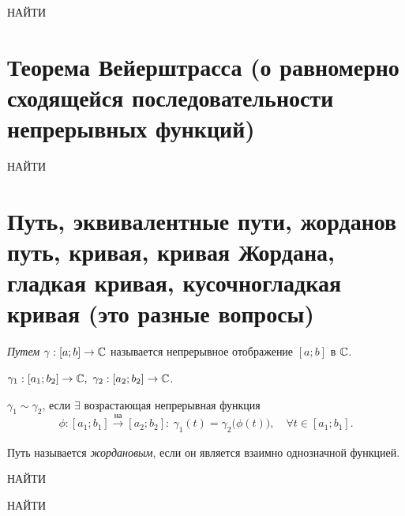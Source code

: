  {\huge НАЙТИ}

\section{Теорема Вейерштрасса (о равномерно сходящейся последовательности непрерывных функций)}

 {\huge НАЙТИ}

\section{Путь, эквивалентные пути, жорданов путь, кривая, кривая Жордана, гладкая кривая, кусочногладкая кривая (это разные вопросы)}

\begin{definition}[Путь]
	\emph{Путем} $\gamma:[a ; b]\rightarrow \mathbb{C}$ называется непрерывное отображение $[a ; b]$ в $\mathbb{C}$.
\end{definition}

\begin{definition}
	$\gamma_1:[a_1 ; b_2] \rightarrow \C, \ \gamma_2:[a_2 ; b_2] \rightarrow \C$.

	$\gamma_1 \sim \gamma_2$, если $\exists $ возрастающая непрерывная функция
	\[
		\phi:[a_1 ; b_1] \xrightarrow[]{\text{на}} [a_2 ; b_2]: \ \gamma_1 (t) = \gamma_2 \big(\phi(t)\big), \quad \forall t \in [a_1 ; b_1].
	\]
\end{definition}

\begin{definition}
  Путь называется \emph{жордановым}, если он является взаимно однозначной функцией.
\end{definition}

\begin{definition}
  {\huge НАЙТИ}
\end{definition}

\begin{definition}
  {\huge НАЙТИ}
\end{definition}
